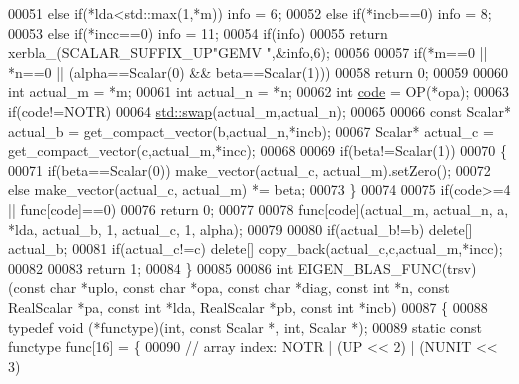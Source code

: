 \begin{DoxyCode}
00051   \textcolor{keywordflow}{else} \textcolor{keywordflow}{if}(*lda<std::max(1,*m))    info = 6;
00052   \textcolor{keywordflow}{else} \textcolor{keywordflow}{if}(*incb==0)               info = 8;
00053   \textcolor{keywordflow}{else} \textcolor{keywordflow}{if}(*incc==0)               info = 11;
00054   \textcolor{keywordflow}{if}(info)
00055     \textcolor{keywordflow}{return} xerbla\_(SCALAR\_SUFFIX\_UP\textcolor{stringliteral}{"GEMV "},&info,6);
00056 
00057   \textcolor{keywordflow}{if}(*m==0 || *n==0 || (alpha==Scalar(0) && beta==Scalar(1)))
00058     \textcolor{keywordflow}{return} 0;
00059 
00060   \textcolor{keywordtype}{int} actual\_m = *m;
00061   \textcolor{keywordtype}{int} actual\_n = *n;
00062   \textcolor{keywordtype}{int} \hyperlink{structcode}{code} = OP(*opa);
00063   \textcolor{keywordflow}{if}(code!=NOTR)
00064     \hyperlink{endian_8c_a3ca5ecd34b04d6a243c054ac3a57f68d}{std::swap}(actual\_m,actual\_n);
00065 
00066   \textcolor{keyword}{const} Scalar* actual\_b = get\_compact\_vector(b,actual\_n,*incb);
00067   Scalar* actual\_c = get\_compact\_vector(c,actual\_m,*incc);
00068 
00069   \textcolor{keywordflow}{if}(beta!=Scalar(1))
00070   \{
00071     \textcolor{keywordflow}{if}(beta==Scalar(0)) make\_vector(actual\_c, actual\_m).setZero();
00072     \textcolor{keywordflow}{else}                make\_vector(actual\_c, actual\_m) *= beta;
00073   \}
00074 
00075   \textcolor{keywordflow}{if}(code>=4 || func[code]==0)
00076     \textcolor{keywordflow}{return} 0;
00077 
00078   func[code](actual\_m, actual\_n, a, *lda, actual\_b, 1, actual\_c, 1, alpha);
00079 
00080   \textcolor{keywordflow}{if}(actual\_b!=b) \textcolor{keyword}{delete}[] actual\_b;
00081   \textcolor{keywordflow}{if}(actual\_c!=c) \textcolor{keyword}{delete}[] copy\_back(actual\_c,c,actual\_m,*incc);
00082 
00083   \textcolor{keywordflow}{return} 1;
00084 \}
00085 
00086 \textcolor{keywordtype}{int} EIGEN\_BLAS\_FUNC(trsv)(\textcolor{keyword}{const} \textcolor{keywordtype}{char} *uplo, \textcolor{keyword}{const} \textcolor{keywordtype}{char} *opa, \textcolor{keyword}{const} \textcolor{keywordtype}{char} *diag, \textcolor{keyword}{const} \textcolor{keywordtype}{int} *n, \textcolor{keyword}{const} 
      RealScalar *pa, \textcolor{keyword}{const} \textcolor{keywordtype}{int} *lda, RealScalar *pb, \textcolor{keyword}{const} \textcolor{keywordtype}{int} *incb)
00087 \{
00088   \textcolor{keyword}{typedef} void (*functype)(int, \textcolor{keyword}{const} Scalar *, int, Scalar *);
00089   \textcolor{keyword}{static} \textcolor{keyword}{const} functype func[16] = \{
00090     \textcolor{comment}{// array index: NOTR  | (UP << 2) | (NUNIT << 3)}

\end{DoxyCode}
